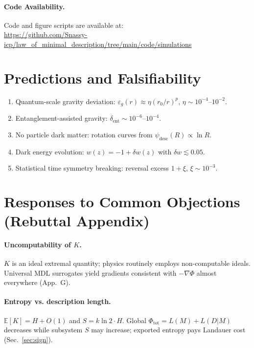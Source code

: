 \documentclass[aps,preprint,onecolumn,longbibliography,nofootinbib]{revtex4-2}
\numberwithin{equation}{section}
\begin{document}
\paragraph*{Code Availability.} Code and figure scripts are available at:\\
\url{https://github.com/Snassy-icp/law_of_minimal_description/tree/main/code/simulations}

\section{Predictions and Falsifiability}
\begin{enumerate}
\item Quantum-scale gravity deviation: $\varepsilon_g(r)\approx\eta(r_0/r)^p$, $\eta\sim10^{-4}$--$10^{-2}$.
\item Entanglement-assisted gravity: $\delta_{\mathrm{ent}}\sim10^{-6}$--$10^{-4}$.
\item No particle dark matter: rotation curves from $\psi_{\text{desc}}(R)\propto\ln R$.
\item Dark energy evolution: $w(z)=-1+\delta w(z)$ with $\delta w\lesssim0.05$.
\item Statistical time symmetry breaking: reversal excess $1+\xi$, $\xi\sim10^{-3}$.
\end{enumerate}

\section{Responses to Common Objections (Rebuttal Appendix)}\label{app:E}
\paragraph*{Uncomputability of $K$.} $K$ is an ideal extremal quantity; physics routinely employs non-computable ideals. Universal MDL surrogates yield gradients consistent with $-\nabla\Phi$ almost everywhere (App.~G).

\paragraph*{Entropy vs. description length.} $\mathbb{E}[K]=H+O(1)$ and $S=k\ln2\cdot H$. Global $\Phi_{\text{tot}}=L(M)+L(D|M)$ decreases while subsystem $S$ may increase; exported entropy pays Landauer cost (Sec.~\ref{sec:sign}).
\end{document}

